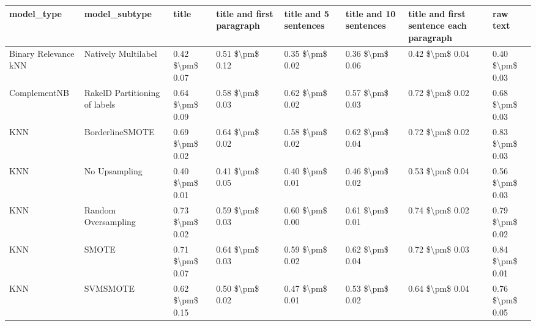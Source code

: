\begin{tabular}{llllllll}
\toprule
                     model\_type &                 model\_subtype &               title & title and first paragraph & title and 5 sentences & title and 10 sentences & title and first sentence each paragraph &        raw text \\
\midrule
           Binary Relevance kNN &           Natively Multilabel &     0.42 \$\textbackslash pm\$ 0.07 &           0.51 \$\textbackslash pm\$ 0.12 &       0.35 \$\textbackslash pm\$ 0.02 &        0.36 \$\textbackslash pm\$ 0.06 &                         0.42 \$\textbackslash pm\$ 0.04 & 0.40 \$\textbackslash pm\$ 0.03 \\
                   ComplementNB & RakelD Partitioning of labels &     0.64 \$\textbackslash pm\$ 0.09 &           0.58 \$\textbackslash pm\$ 0.03 &       0.62 \$\textbackslash pm\$ 0.02 &        0.57 \$\textbackslash pm\$ 0.03 &                         0.72 \$\textbackslash pm\$ 0.02 & 0.68 \$\textbackslash pm\$ 0.03 \\
                            KNN &               BorderlineSMOTE &     0.69 \$\textbackslash pm\$ 0.02 &           0.64 \$\textbackslash pm\$ 0.02 &       0.58 \$\textbackslash pm\$ 0.02 &        0.62 \$\textbackslash pm\$ 0.04 &                         0.72 \$\textbackslash pm\$ 0.02 & 0.83 \$\textbackslash pm\$ 0.03 \\
                            KNN &                 No Upsampling &     0.40 \$\textbackslash pm\$ 0.01 &           0.41 \$\textbackslash pm\$ 0.05 &       0.40 \$\textbackslash pm\$ 0.01 &        0.46 \$\textbackslash pm\$ 0.02 &                         0.53 \$\textbackslash pm\$ 0.04 & 0.56 \$\textbackslash pm\$ 0.03 \\
                            KNN &           Random Oversampling &     0.73 \$\textbackslash pm\$ 0.02 &           0.59 \$\textbackslash pm\$ 0.03 &       0.60 \$\textbackslash pm\$ 0.00 &        0.61 \$\textbackslash pm\$ 0.01 &                         0.74 \$\textbackslash pm\$ 0.02 & 0.79 \$\textbackslash pm\$ 0.02 \\
                            KNN &                         SMOTE &     0.71 \$\textbackslash pm\$ 0.07 &           0.64 \$\textbackslash pm\$ 0.03 &       0.59 \$\textbackslash pm\$ 0.02 &        0.62 \$\textbackslash pm\$ 0.04 &                         0.72 \$\textbackslash pm\$ 0.03 & 0.84 \$\textbackslash pm\$ 0.01 \\
                            KNN &                      SVMSMOTE &     0.62 \$\textbackslash pm\$ 0.15 &           0.50 \$\textbackslash pm\$ 0.02 &       0.47 \$\textbackslash pm\$ 0.01 &        0.53 \$\textbackslash pm\$ 0.02 &                         0.64 \$\textbackslash pm\$ 0.04 & 0.76 \$\textbackslash pm\$ 0.05 \\

\end{tabular}
